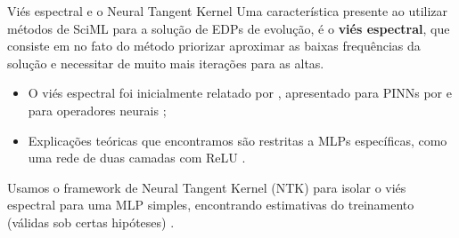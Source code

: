 \begin{frame}{Viés espectral e o Neural Tangent Kernel}
  Uma característica presente ao utilizar métodos de SciML para a solução de EDPs de evolução, é o \textbf{viés espectral}, que consiste em no fato do método priorizar aproximar as baixas frequências da solução e necessitar de muito mais iterações para as altas.

  \begin{itemize}[<+->]
    \item O viés espectral foi inicialmente relatado por \textcite{rahaman2019, xu2019frequency}, apresentado para PINNs por \textcite{wang2022ntk} e para operadores neurais \textcite{li2023pino, khodakarami2026};
    \item Explicações teóricas que encontramos são restritas a MLPs específicas, como uma rede de duas camadas com ReLU \parencite{arora2019, cao2019, basri2019}.
  \end{itemize}
  \begin{information}
    Usamos o framework de Neural Tangent Kernel (NTK) \parencite{jacot2018} para isolar o viés espectral para uma MLP simples, encontrando estimativas do treinamento (válidas sob certas hipóteses)
    \parencite{chizat2019}.
  \end{information}
\end{frame}
